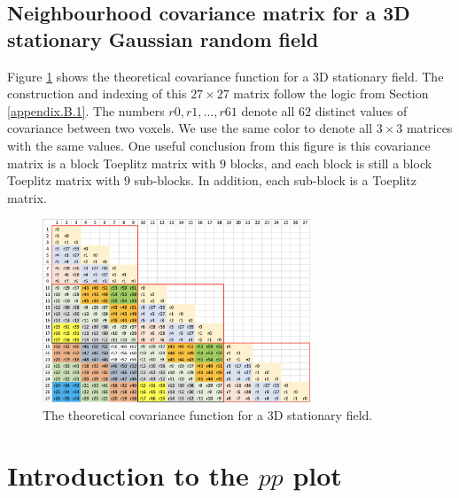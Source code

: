 \documentclass{article}
\begin{document}
\subsection{Neighbourhood covariance matrix for a 3D stationary Gaussian random field}\label{SS:cov}
Figure \ref{fig17} shows the theoretical covariance function for a 3D stationary field. The construction and indexing of this $27 \times 27$ matrix follow the logic from Section \ref{appendix.B.1}. The numbers $r0,r1,...,r61$ denote all $62$ distinct values of covariance between two voxels. We use the same color to denote all $3\times 3$ matrices with the same values. One useful conclusion from this figure is this covariance matrix is a block Toeplitz matrix with $9$ blocks, and each block is still a block Toeplitz matrix with $9$ sub-blocks. In addition, each sub-block is a Toeplitz matrix. 

\begin{figure}[!htp]
\centering
\includegraphics[width = 8cm]{figure/covariance function_3D.png}
\caption{The theoretical covariance function for a 3D stationary field.\label{fig17}}
\end{figure}

\section{Introduction to the $pp$ plot\label{appendix.d}}
\end{document}
